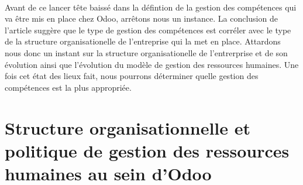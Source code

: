 \paragraph{}Avant de ce lancer tête baissé dans la défintion de la gestion des compétences qui va être mis en place chez Odoo, arrêtons nous un instance. La conclusion de l'article\citep{delobbe} suggère que le type de gestion des compétences est corréler avec le type de la structure organisationelle de l'entreprise qui la met en place. Attardons nous donc un instant sur la structure organisationelle de l'entrerprise et de son évolution ainsi que l'évolution du modèle de gestion des ressources humaines. Une fois cet état des lieux fait, nous pourrons déterminer quelle gestion des compétences est la plus appropriée.
        



\section{Structure organisationnelle et politique de gestion des ressources humaines au sein d'Odoo}
